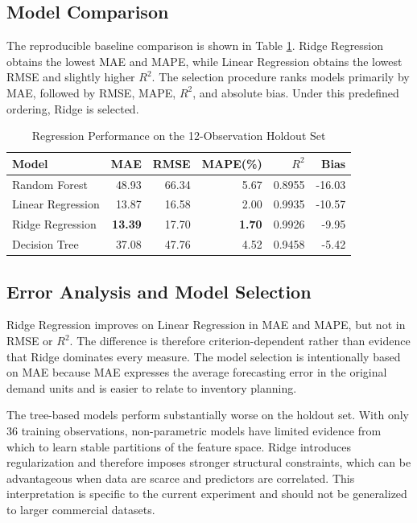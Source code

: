 \documentclass[9pt,conference]{IEEEtran}
\providecommand{\syscite}[1]{}
\begin{document}
\subsection{Model Comparison}
The reproducible baseline comparison is shown in Table \ref{tab:performance}. \syscite{[cite: 1]} Ridge Regression obtains the lowest MAE and MAPE, while Linear Regression obtains the lowest RMSE and slightly higher $R^{2}$. \syscite{[cite: 1]} The selection procedure ranks models primarily by MAE, followed by RMSE, MAPE, $R^{2}$, and absolute bias. \syscite{[cite: 1]} Under this predefined ordering, Ridge is selected. \syscite{[cite: 1]}

\begin{table}[htbp]
\centering
\caption{Regression Performance on the 12-Observation Holdout Set}
\scriptsize
\setlength{\tabcolsep}{2.5pt}
\begin{tabular}{lrrrrr}
\toprule
\textbf{Model} & \textbf{MAE} & \textbf{RMSE} & \textbf{MAPE(\%)} & \textbf{$R^{2}$} & \textbf{Bias} \\
\midrule
Random Forest & 48.93 & 66.34 & 5.67 & 0.8955 & -16.03 \syscite{[cite: 1]} \\
Linear Regression & 13.87 & 16.58 & 2.00 & 0.9935 & -10.57 \syscite{[cite: 1]} \\
Ridge Regression & \textbf{13.39} & 17.70 & \textbf{1.70} & 0.9926 & -9.95 \syscite{[cite: 1]} \\
Decision Tree & 37.08 & 47.76 & 4.52 & 0.9458 & -5.42 \syscite{[cite: 1]} \\
\bottomrule
\end{tabular}
\label{tab:performance}
\end{table}

\subsection{Error Analysis and Model Selection}
Ridge Regression improves on Linear Regression in MAE and MAPE, but not in RMSE or $R^{2}$. \syscite{[cite: 1]} The difference is therefore criterion-dependent rather than evidence that Ridge dominates every measure. \syscite{[cite: 1]} The model selection is intentionally based on MAE because MAE expresses the average forecasting error in the original demand units and is easier to relate to inventory planning. \syscite{[cite: 1]}

The tree-based models perform substantially worse on the holdout set. \syscite{[cite: 1]} With only 36 training observations, non-parametric models have limited evidence from which to learn stable partitions of the feature space. \syscite{[cite: 1]} Ridge introduces regularization and therefore imposes stronger structural constraints, which can be advantageous when data are scarce and predictors are correlated. \syscite{[cite: 1]} This interpretation is specific to the current experiment and should not be generalized to larger commercial datasets. \syscite{[cite: 1]}
\end{document}
